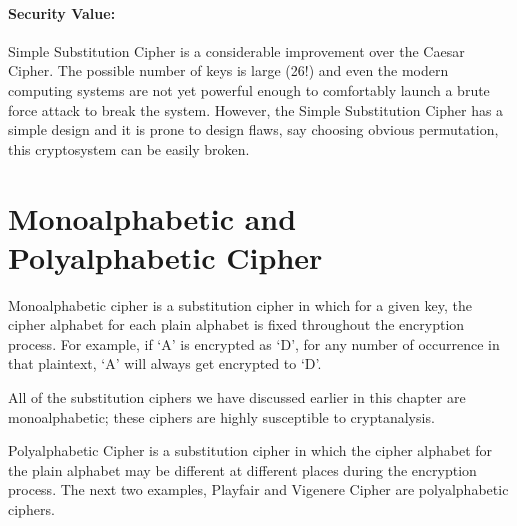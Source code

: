 \documentclass[british]{report}
\begin{document}
\paragraph*{Security Value:}

Simple Substitution Cipher is a considerable improvement over the
Caesar Cipher. The possible number of keys is large (26!) and even
the modern computing systems are not yet powerful enough to comfortably
launch a brute force attack to break the system. However, the Simple
Substitution Cipher has a simple design and it is prone to design
flaws, say choosing obvious permutation, this cryptosystem can be
easily broken.

\section{Monoalphabetic and Polyalphabetic Cipher}

Monoalphabetic cipher is a substitution cipher in which for a given
key, the cipher alphabet for each plain alphabet is fixed throughout
the encryption process. For example, if \textquoteleft A\textquoteright{}
is encrypted as \textquoteleft D\textquoteright , for any number of
occurrence in that plaintext, \textquoteleft A\textquoteright{} will
always get encrypted to \textquoteleft D\textquoteright .

All of the substitution ciphers we have discussed earlier in this
chapter are monoalphabetic; these ciphers are highly susceptible to
cryptanalysis.

Polyalphabetic Cipher is a substitution cipher in which the cipher
alphabet for the plain alphabet may be different at different places
during the encryption process. The next two examples, Playfair and
Vigenere Cipher are polyalphabetic ciphers.
\end{document}
